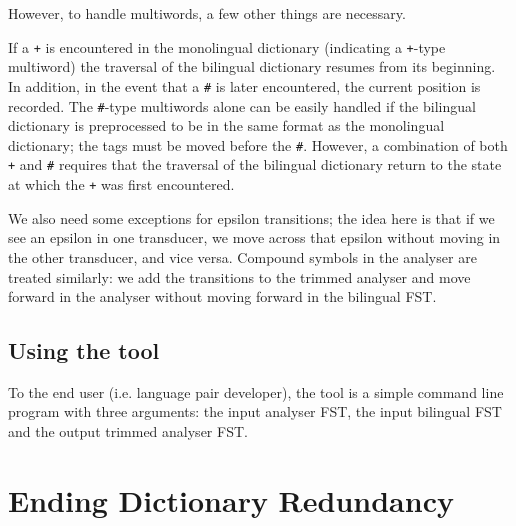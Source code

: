 \documentclass[10pt, a4paper]{article}
\newcommand{\ana}[1]{\texttt{#1}}
\begin{document}
However, to handle multiwords, a few other things are necessary.

If a \ana{+} is encountered in the monolingual dictionary (indicating
a \ana{+}-type multiword) the traversal of the bilingual dictionary
resumes from its beginning. In addition, in the event that a \ana{\#}
is later encountered, the current position is recorded. The
\ana{\#}-type multiwords alone can be easily handled if the bilingual
dictionary is preprocessed to be in the same format as the monolingual
dictionary; the tags must be moved before the \ana{\#}.  However, a
combination of both \ana{+} and \ana{\#} requires that the traversal of the
bilingual dictionary return to the state at which the \ana{+} was
first encountered.

We also need some exceptions for epsilon transitions; the idea here is
that if we see an epsilon in one transducer, we move across that
epsilon without moving in the other transducer, and vice versa.
Compound symbols in the analyser are treated similarly: we add the
transitions to the trimmed analyser and move forward in the analyser
without moving forward in the bilingual FST.

\subsection{Using the tool}
To the end user (i.e. language pair developer), the tool is a simple
command line program with three arguments: the input analyser FST, the
input bilingual FST and the output trimmed analyser FST. 


\section{Ending Dictionary Redundancy}
\end{document}
